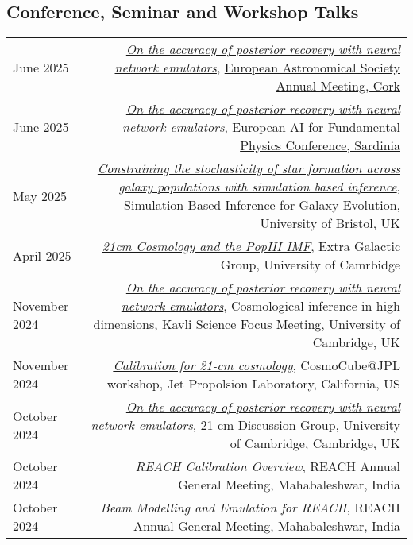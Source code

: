 \documentclass{article}
\begin{document}
\subsection*{Conference, Seminar and Workshop Talks}
\begin{tabular}{L!{\vrule}R}
    June 2025 & \textit{\href{}{On the accuracy of posterior recovery with neural network emulators}}, \href{https://eas.unige.ch/EAS_meeting/session.jsp?id=S15}{European Astronomical Society Annual Meeting, Cork} \\
    June 2025 & \textit{\href{}{On the accuracy of posterior recovery with neural network emulators}}, \href{https://agenda.infn.it/event/43565/}{European AI for Fundamental Physics Conference, Sardinia} \\
    May 2025 & \textit{\href{}{Constraining the stochasticity of star formation across galaxy populations with simulation based inference}}, \href{https://sbi-galev.github.io/2025/}{Simulation Based Inference for Galaxy Evolution}, University of Bristol, UK \\
    April 2025 & \textit{\href{https://github.com/htjb/Talks/raw/master/Talks/Galaxies_discussion_group_IMF_21cm_April25/galaxies_discussion_IMF_21cm_April25.pdf}{21cm Cosmology and the PopIII IMF}}, Extra Galactic Group, University of Camrbidge \\
    November 2024 & \textit{\href{https://github.com/htjb/Talks/raw/master/Talks/Kavli-high-dimensional-analysis-20NOV24/posterior-validation.pdf}{On the accuracy of posterior recovery with neural network emulators}}, Cosmological inference in high dimensions, Kavli Science Focus Meeting, University of Cambridge, UK \\
    November 2024 & \textit{\href{https://github.com/htjb/Talks/raw/master/Talks/CosmoCube-JPL-Workshop-2024/calibration-jpl-cosmocube.pdf}{Calibration for 21-cm cosmology}}, CosmoCube@JPL workshop, Jet Propolsion Laboratory, California, US \\
    October 2024 & \textit{\href{https://github.com/htjb/Talks/raw/master/Talks/21cm-Meeting-14OCT24/posterior-validation.pdf}{On the accuracy of posterior recovery with neural network emulators}}, 21 cm Discussion Group, University of Cambridge, Cambridge, UK \\
    October 2024 & \textit{REACH Calibration Overview}, REACH Annual General Meeting, Mahabaleshwar, India \\
    October 2024 & \textit{Beam Modelling and Emulation for REACH}, REACH Annual General Meeting, Mahabaleshwar, India \\

\end{tabular}
\end{document}
